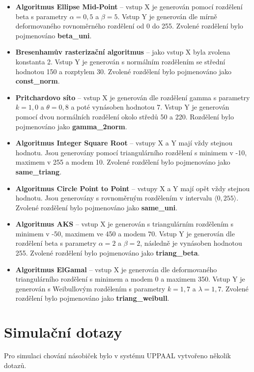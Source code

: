 \begin{itemize}
    \item \textbf{Algoritmus Ellipse Mid-Point} -- vstup X je generován pomocí rozdělení beta s parametry $\alpha = 0,5$ a $\beta = 5$. Vstup Y je generován dle mírně deformovaného rovnoměrného rozdělení od 0 do 255. Zvolené rozdělení bylo pojmenováno \textbf{beta\_uni}.
    \item \textbf{Bresenhamův rasterizační algoritmus} -- jako vstup X byla zvolena konstanta 2. Vstup Y je generován s normálním rozdělením se střední hodnotou 150 a rozptylem 30. Zvolené rozdělení bylo pojmenováno jako \textbf{const\_norm}.
    \item \textbf{Pritchardovo síto} -- vstup X je generován dle rozdělení gamma s parametry $k=1,0$ a $\theta=0,8$ a poté vynásoben hodnotou 7. Vstup Y je generován pomocí dvou normálních rozdělení okolo středů 50 a 220. Rozdělení bylo pojmenováno jako \textbf{gamma\_2norm}.
    \item \textbf{Algoritmus Integer Square Root} -- vstupy X a Y mají vždy stejnou hodnotu. Jsou generovány pomocí triangulárního rozdělení s minimem v -10, maximem v 255 a modem 10. Zvolené rozdělení bylo pojmenováno jako \textbf{same\_triang}.
    \item \textbf{Algoritmus Circle Point to Point} -- vstupy X a Y mají opět vždy stejnou hodnotu. Jsou generovány s rovnoměrným rozdělením v intervalu $\langle 0, 255 \rangle$. Zvolené rozdělení bylo pojmenováno jako \textbf{same\_uni}.
    \item \textbf{Algoritmus AKS} -- vstup X je generován s triangulárním rozdělením s minimem v -50, maximem ve 450 a modem 70. Vstup Y je generován dle rozdělení beta s parametry $\alpha = 2$ a $\beta = 2$, následně je vynásoben hodnotou 255. Zvolené rozdělení bylo pojmenováno jako \textbf{triang\_beta}.
    \item \textbf{Algoritmus ElGamal} -- vstup X je generován dle deformovaného triangulárního rozdělení s minimem a modem 0 a maximem 350. Vstup Y je generován s Weibullovým rozdělením s parametry $k = 1,7$ a $\lambda = 1,7$. Zvolené rozdělení bylo pojmenováno jako \textbf{triang\_weibull}.
\end{itemize}

\section{Simulační dotazy} \label{sim_dotazy}
Pro simulaci chování násobiček bylo v systému UPPAAL vytvořeno několik dotazů.

